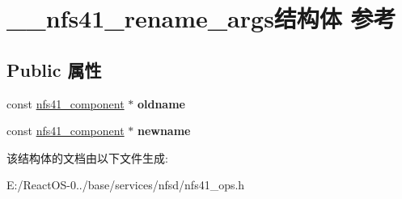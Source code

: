 \hypertarget{struct____nfs41__rename__args}{}\section{\+\_\+\+\_\+nfs41\+\_\+rename\+\_\+args结构体 参考}
\label{struct____nfs41__rename__args}
\subsection*{Public 属性}
\begin{DoxyCompactItemize}
\item 
\mbox{\label{struct____nfs41__rename__args_a07c74220fe24681eb1ab8b04a57d3680}} 
const \hyperlink{struct____nfs41__component}{nfs41\+\_\+component} $\ast$ {\bfseries oldname}
\item 
\mbox{\label{struct____nfs41__rename__args_a848eba6fe9994dcf330d82adc4aab931}} 
const \hyperlink{struct____nfs41__component}{nfs41\+\_\+component} $\ast$ {\bfseries newname}
\end{DoxyCompactItemize}


该结构体的文档由以下文件生成\+:\begin{DoxyCompactItemize}
\item 
E\+:/\+React\+O\+S-\/0../base/services/nfsd/nfs41\+\_\+ops.\+h\end{DoxyCompactItemize}
